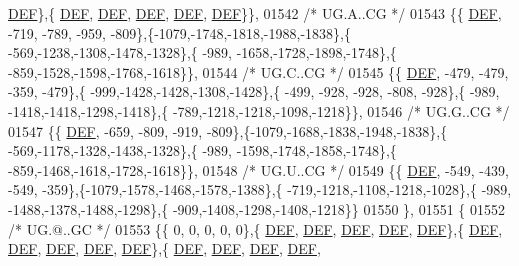 \begin{DoxyCode}
      \mbox{\hyperlink{1_88_84__epars_8h_a397419fc12b37ed479c8abb9d444d843}{DEF}}\},\{  \mbox{\hyperlink{1_88_84__epars_8h_a397419fc12b37ed479c8abb9d444d843}{DEF}},  \mbox{\hyperlink{1_88_84__epars_8h_a397419fc12b37ed479c8abb9d444d843}{DEF}},  \mbox{\hyperlink{1_88_84__epars_8h_a397419fc12b37ed479c8abb9d444d843}{DEF}},  \mbox{\hyperlink{1_88_84__epars_8h_a397419fc12b37ed479c8abb9d444d843}{DEF}},  \mbox{\hyperlink{1_88_84__epars_8h_a397419fc12b37ed479c8abb9d444d843}{DEF}}\}\},
01542 \textcolor{comment}{/* UG.A..CG */}
01543 \{\{  \mbox{\hyperlink{1_88_84__epars_8h_a397419fc12b37ed479c8abb9d444d843}{DEF}}, -719, -789, -959, -809\},\{-1079,-1748,-1818,-1988,-1838\},\{ -569,-1238,-1308,-1478,-1328\},\{ -989,
      -1658,-1728,-1898,-1748\},\{ -859,-1528,-1598,-1768,-1618\}\},
01544 \textcolor{comment}{/* UG.C..CG */}
01545 \{\{  \mbox{\hyperlink{1_88_84__epars_8h_a397419fc12b37ed479c8abb9d444d843}{DEF}}, -479, -479, -359, -479\},\{ -999,-1428,-1428,-1308,-1428\},\{ -499, -928, -928, -808, -928\},\{ -989,
      -1418,-1418,-1298,-1418\},\{ -789,-1218,-1218,-1098,-1218\}\},
01546 \textcolor{comment}{/* UG.G..CG */}
01547 \{\{  \mbox{\hyperlink{1_88_84__epars_8h_a397419fc12b37ed479c8abb9d444d843}{DEF}}, -659, -809, -919, -809\},\{-1079,-1688,-1838,-1948,-1838\},\{ -569,-1178,-1328,-1438,-1328\},\{ -989,
      -1598,-1748,-1858,-1748\},\{ -859,-1468,-1618,-1728,-1618\}\},
01548 \textcolor{comment}{/* UG.U..CG */}
01549 \{\{  \mbox{\hyperlink{1_88_84__epars_8h_a397419fc12b37ed479c8abb9d444d843}{DEF}}, -549, -439, -549, -359\},\{-1079,-1578,-1468,-1578,-1388\},\{ -719,-1218,-1108,-1218,-1028\},\{ -989,
      -1488,-1378,-1488,-1298\},\{ -909,-1408,-1298,-1408,-1218\}\}
01550 \},
01551 \{
01552 \textcolor{comment}{/* UG.@..GC */}
01553 \{\{    0,    0,    0,    0,    0\},\{  \mbox{\hyperlink{1_88_84__epars_8h_a397419fc12b37ed479c8abb9d444d843}{DEF}},  \mbox{\hyperlink{1_88_84__epars_8h_a397419fc12b37ed479c8abb9d444d843}{DEF}},  \mbox{\hyperlink{1_88_84__epars_8h_a397419fc12b37ed479c8abb9d444d843}{DEF}},  \mbox{\hyperlink{1_88_84__epars_8h_a397419fc12b37ed479c8abb9d444d843}{DEF}},  \mbox{\hyperlink{1_88_84__epars_8h_a397419fc12b37ed479c8abb9d444d843}{DEF}}\},\{  
      \mbox{\hyperlink{1_88_84__epars_8h_a397419fc12b37ed479c8abb9d444d843}{DEF}},  \mbox{\hyperlink{1_88_84__epars_8h_a397419fc12b37ed479c8abb9d444d843}{DEF}},  \mbox{\hyperlink{1_88_84__epars_8h_a397419fc12b37ed479c8abb9d444d843}{DEF}},  \mbox{\hyperlink{1_88_84__epars_8h_a397419fc12b37ed479c8abb9d444d843}{DEF}},  \mbox{\hyperlink{1_88_84__epars_8h_a397419fc12b37ed479c8abb9d444d843}{DEF}}\},\{  \mbox{\hyperlink{1_88_84__epars_8h_a397419fc12b37ed479c8abb9d444d843}{DEF}},  \mbox{\hyperlink{1_88_84__epars_8h_a397419fc12b37ed479c8abb9d444d843}{DEF}},  \mbox{\hyperlink{1_88_84__epars_8h_a397419fc12b37ed479c8abb9d444d843}{DEF}},  \mbox{\hyperlink{1_88_84__epars_8h_a397419fc12b37ed479c8abb9d444d843}{DEF}},  

\end{DoxyCode}
